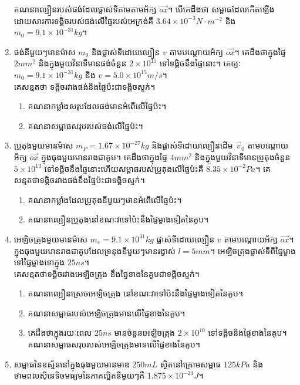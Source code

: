 \begin{enumerate}[m]
	គណនាល្បឿនរបស់ផង់ដែលផ្លាស់ទីតាមតាមអ័ក្ស $\overrightarrow{ox}$។ បើគេដឹងថា សម្ពាធដែលកើតឡើងដោយសារការទង្គិចរបស់ផង់លើផ្ទៃរបស់អេក្រង់គឺ $3.64\times10^{-3}N\cdot m^{-2}$ និង $m_{0}=9.1\times10^{-31}kg$។
	\item ផង់នីមួយៗមានម៉ាស $m_{0}$ និងផ្លាស់ទីដោយល្បឿន $v$ តាមបណ្តោយអ័ក្ស $\overrightarrow{ox}$។ គេដឹងថាក្នុងផ្ទៃ $2mm^{2}$ និងក្នុងមួយវិនាទីមានផង់ចំនួន $2\times10^{15}$ ទៅទង្គិចនឹងផ្ទៃនោះ។ គេឲ្យៈ $m_{0}=9.1\times10^{-31}kg$ និង $v=5.0\times10^{15}m/s$។\\
	គេសន្មតថា ទង្គិចរវាងផង់និងផ្ទៃប៉ះជាទង្គិចស្ទក់។
	\begin{enumerate}[k]
		\item គណនាកម្លាំងសរុបដែលផង់មានអំពើលើផ្ទៃប៉ះ។
		\item គណនាសម្ពាធសរុបរបស់ផង់លើផ្ទៃប៉ះ។
	\end{enumerate}
	\item  ប្រូតុងមួយមានម៉ាស $m_{P}=1.67\times10^{-27}kg$ និងផ្លាស់ទីដោយល្បឿនដើម $\overrightarrow{v}_{0}$ តាមបណ្តោយអ័ក្ស $\overrightarrow{ox}$ ក្នុងធុងមួយមានរាងជាគូប។ គេដឹងថាក្នុងផ្ទៃ $4mm^{2}$ និងក្នុងមួយវិនាទីមានប្រូតុងចំនួន $5\times10^{13}$ ទៅទង្គិចនឹងផ្ទៃនោះហើយសម្ពាធរបស់ប្រូតុងលើផ្ទៃប៉ះគឺ $8.35\times10^{-2}Pa$។ គេសន្មតថាទង្គិចរវាងផង់នឹងផ្ទៃប៉ះជាទង្គិចស្ទក់។
	\begin{enumerate}[k]
		\item គណនាកម្លាំងដែលប្រូតុងនីមួយៗមានអំពើលើផ្ទៃប៉ះ។
		\item គណនាល្បឿនប្រូតុងនៅខណៈវាទៅប៉ះនឹងផ្ទៃម្ខាងទៀតនៃគូប។
	\end{enumerate}
	\item អេឡិចត្រុងមួយមានម៉ាស $m_{e}=9.1\times10^{31}kg$ ផ្លាស់ទីដោយល្បឿន $v$ តាមបណ្តោយអ័ក្ស $\overrightarrow{ox}$។ ក្នុងធុងមួយមានរាងជាគូបដែលទ្រនុងនីមួយៗមានរង្វាស់ $l=5mm$។ អេឡិចត្រុងផ្លាស់ទីពីផ្ទៃម្ខាងទៅផ្ទៃម្ខាងទោក្នុង $25ns$។\\ គេសន្មតថាទង្គិចរវាងអេឡិចត្រុង នឹងផ្ទៃខាងនៃគូបជាទង្គិចស្ទក់។
	\begin{enumerate}[k]
		\item គណនាល្បឿនស្រេចអេឡិចត្រុង នៅខណៈវាទៅប៉ះនឹងផ្ទៃម្ខាងទៀតនៃគូប។
		\item គណនាសម្ពាធរបស់អេឡិចត្រុងមានលើផ្ទៃខាងនៃគូប។
		\item គេដឹងថាក្នុងរយៈពេល $25ns$ មានចំនួនអេឡិចត្រុង $2\times10^{10}$ ទៅទង្គិចនិងផ្ទៃខាងនៃគូប។\\ គណនាសម្ពាធសរុបរបស់អេឡិចត្រុងមានលើផ្ទៃខាងនៃគូប។
	\end{enumerate}
	\item សម្ពាធនៃឧស្ម័ននៅក្នុងធុងមួយមានមាឌ $250mL$ ស្ថិតនៅក្រោមសម្ពាធ $125kPa$ និងថាមពលសុីនេទិចមធ្យមនៃភាគល្អិតនីមួយៗគឺ $1.875\times10^{-21}J$។

\end{enumerate}

